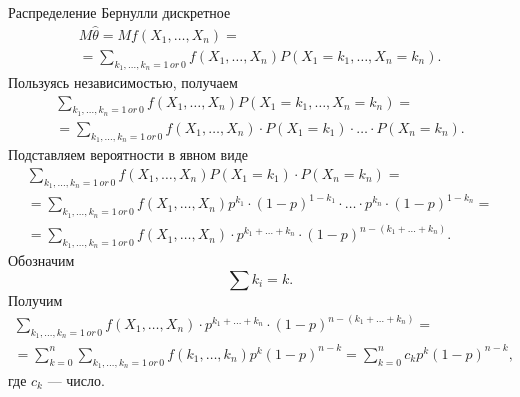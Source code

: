 Распределение Бернулли дискретное
\begin{equation*}
  \begin{split}
    M \hat{ \theta } =
    Mf \left( X_1, \dotsc, X_n \right) = \\
    = \sum \limits_{k_1, \dotsc, k_n = 1 \, or \, 0}
      f \left( X_1, \dotsc, X_n \right) P \left( X_1 = k_1, \dotsc, X_n = k_n \right).
  \end{split}
\end{equation*}
Пользуясь независимостью, получаем
\begin{equation*}
  \begin{split}
   \sum \limits_{k_1, \dotsc, k_n = 1 \, or \, 0}
      f \left( X_1, \dotsc, X_n \right) P \left( X_1 = k_1, \dotsc, X_n = k_n \right) = \\
    = \sum \limits_{k_1, \dotsc, k_n = 1 \, or \, 0}
      f \left( X_1, \dotsc, X_n \right) \cdot
      P \left( X_1 = k_1 \right) \cdot \dotsc \cdot P \left( X_n = k_n \right).
  \end{split}
\end{equation*}
Подставляем вероятности в явном виде
\begin{equation*}
  \begin{split}
    \sum \limits_{k_1, \dotsc, k_n = 1 \, or \, 0}
      f \left( X_1, \dotsc, X_n \right) P \left( X_1 = k_1 \right) \cdot P \left( X_n = k_n \right) = \\
    = \sum \limits_{k_1, \dotsc, k_n = 1 \, or \, 0}
      f \left( X_1, \dotsc, X_n \right) p^{k_1} \cdot
      \left( 1 - p \right)^{1 - k_1} \cdot \dotsc \cdot p^{k_n} \cdot \left( 1 - p \right)^{1 - k_n} = \\
    = \sum \limits_{k_1, \dotsc, k_n = 1 \, or \, 0}
      f \left( X_1, \dotsc, X_n \right) \cdot
      p^{k_1 + \dotsc + k_n} \cdot \left( 1 - p \right)^{n - \left( k_1 + \dotsc + k_n \right) }.
    \end{split}
\end{equation*}
Обозначим
$$ \sum k_i =
  k.$$
Получим
\begin{equation*}
  \begin{split}
    \sum \limits_{k_1, \dotsc, k_n = 1 \, or \, 0}
      f \left( X_1, \dotsc, X_n \right) \cdot
      p^{k_1 + \dotsc + k_n} \cdot \left( 1 - p \right)^{n - \left( k_1 + \dotsc + k_n \right) } = \\
    = \sum \limits_{k = 0}^n
      \sum \limits_{k_1, \dotsc, k_n = 1 \, or \, 0}
        f \left( k_1, \dotsc, k_n \right) p^k \left( 1 - p \right)^{n - k} =
    \sum \limits_{k = 0}^n c_k p^k \left( 1 - p \right)^{n - k},
  \end{split}
\end{equation*}
где $c_k$ --- число.

